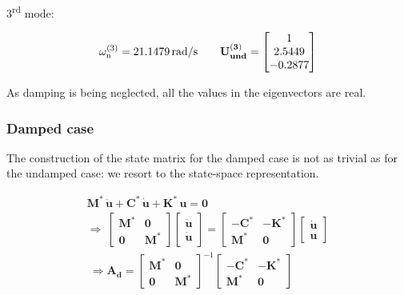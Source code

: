 \documentclass[a4paper,12pt,oneside]{article}
\begin{document}
\vspace{5pt}

\begin{center}
	3\textsuperscript{rd} mode:
\end{center}
\[
	\omega_\textup{n}^{(3)} = 21.1479 \, \text{rad/s} \hspace{20pt}
		\mathbf{U_{und}^{(3)}} =	\begin{bmatrix}
													1 \\
													2.5449 \\
													-0.2877
												\end{bmatrix}
\]

As damping is being neglected, all the values in the eigenvectors are real.

\subsubsection*{Damped case}
\label{ssubs:damped_parameters}

The construction of the state matrix for the damped case is not as trivial as for the undamped case: we resort to the state-space representation.

\[ \begin{split}
	\mathbf{M^*} \, \ddot{\mathbf{u}} + \mathbf{C^*} \, \dot{\mathbf{u}} +
		\mathbf{K^*} \, \mathbf{u} = \mathbf{0} \\[10pt]
	\Rightarrow ~ \begin{bmatrix}
									\mathbf{M^*}	& \mathbf{0} \\
									\mathbf{0}		& \mathbf{M^*}
								\end{bmatrix}
								\begin{bmatrix}
									\ddot{\mathbf{u}} \\
									\dot{\mathbf{u}}
								\end{bmatrix} =
								\begin{bmatrix}
									- \mathbf{C^*}	& - \mathbf{K^*} \\
									\mathbf{M^*}		& \mathbf{0}
								\end{bmatrix}
								\begin{bmatrix}
									\dot{\mathbf{u}} \\
									\mathbf{u}
								\end{bmatrix} \\[10pt]
	~ \Rightarrow \mathbf{A_d} =	\begin{bmatrix}
																	\mathbf{M^*}	& \mathbf{0} \\
																	\mathbf{0}		& \mathbf{M^*}
																\end{bmatrix}^{-1}
																\begin{bmatrix}
																	- \mathbf{C^*}	& - \mathbf{K^*} \\
																	\mathbf{M^*}		& \mathbf{0}
																\end{bmatrix}
\end{split} \]
\end{document}
